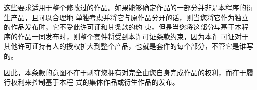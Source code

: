 \begin{enumerate}
\begin{enumerate}
        \end{enumerate}

        这些要求适用于整个修改过的作品。如果能够确定作品的一部分并非是本程序的衍生产品，且可以合理地 单独考虑并将它与原作品分开的话，则当您将它作为独立的作品发布时，它不受此许可证和其条款的约 束。但是当您将这部分与基于本程序的作品一同发布时，则整个套件将受到本许可证条款约束，因为本许 可证对于其他许可证持有人的授权扩大到整个产品，也就是套件的每个部分，不管它是谁写的。


        因此，本条款的意图不在于剥夺您拥有对完全由您自身完成作品的权利，而在于履行权利来控制基于本程 式的集体作品或衍生作品的发布。



\end{enumerate}

